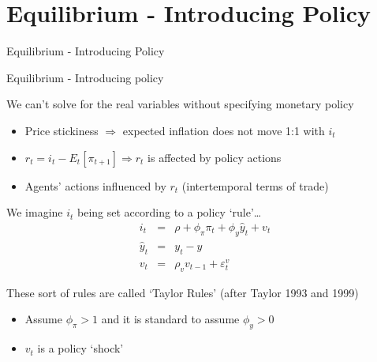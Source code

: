 \documentclass{beamer}
\begin{document}
\section{Equilibrium - Introducing Policy}

\begin{frame}

\begin{center}
{\LARGE Equilibrium - Introducing Policy}
\end{center}

\end{frame}


	
\begin{frame}{Equilibrium - Introducing policy}

We can't solve for the real variables without specifying monetary policy
\begin{itemize}
\item	Price stickiness $\Rightarrow$ expected inflation does not move 1:1 with $i_{t}$
\item	$r_{t} = i_{t} - E_{t}[\pi_{t+1}] \Rightarrow r_{t}$ is affected by policy actions
\item	Agents' actions influenced by $r_{t}$ (intertemporal terms of trade)
\end{itemize}

\vspace{2mm}
We imagine $i_{t}$ being set according to a policy `rule'\ldots
\begin{eqnarray*}
i_{t} 		&=& \rho + \phi_{\pi} \pi_{t} + \phi_{y} \hat{y}_{t} + v_{t} \\
\hat{y}_{t}	&=& y_{t} - y	\\
v_{t} 		&=& \rho_{v} v_{t-1} + \varepsilon^{v}_{t}
\end{eqnarray*}

These sort of rules are called `Taylor Rules' (after Taylor 1993 and 1999)
\begin{itemize}
\item	Assume $\phi_{\pi}>1$ and it is standard to assume $\phi_{y}>0$
\item	$v_{t}$ is a policy `shock'
\end{itemize}

\end{frame}
\end{document}
